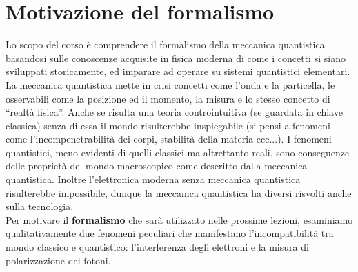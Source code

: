 \documentclass[FisicaTeorica.tex]{subfiles}
\begin{document}
\chapter{Motivazione del formalismo}
Lo scopo del corso è comprendere il formalismo della meccanica quantistica basandosi sulle conoscenze acquisite in fisica moderna di come i concetti si siano sviluppati storicamente, ed imparare ad operare su sistemi quantistici elementari. La meccanica quantistica mette in crisi concetti come l’onda e la particella, le osservabili come la posizione ed il momento, la misura e lo stesso concetto di “realtà fisica”. Anche se risulta una teoria controintuitiva (se guardata in chiave classica) senza di essa il mondo risulterebbe inspiegabile (si pensi a fenomeni come l’incompenetrabilità dei corpi, stabilità della materia ecc...). I fenomeni quantistici, meno evidenti di quelli classici ma altrettanto reali, sono conseguenze delle proprietà del mondo macroscopico come descritto dalla meccanica quantistica. Inoltre l’elettronica moderna senza meccanica quantistica risulterebbe impossibile, dunque la meccanica quantistica ha diversi risvolti anche sulla tecnologia. \\
Per motivare il \textbf{formalismo} che sarà utilizzato nelle prossime lezioni, esaminiamo qualitativamente due fenomeni peculiari che manifestano l'incompatibilità tra mondo classico e quantistico: l'interferenza degli elettroni e la misura di polarizzazione dei fotoni.
\end{document}
